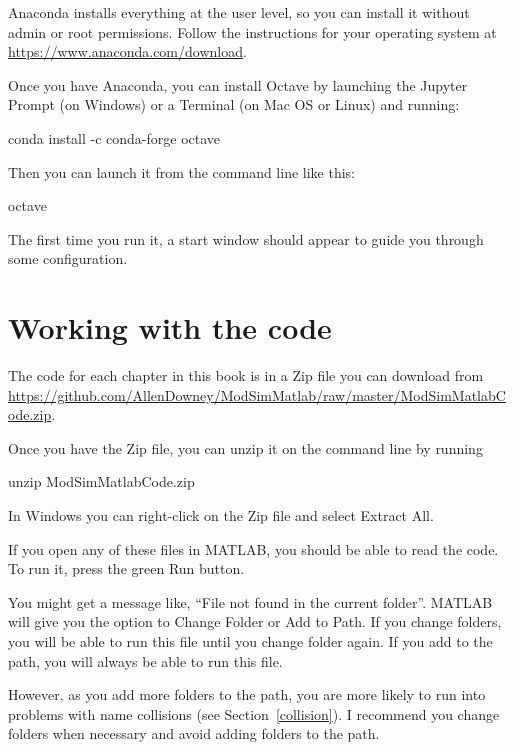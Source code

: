 Anaconda installs everything at the user level, so you can install it without admin or root permissions.  Follow the instructions for your operating system at \url{https://www.anaconda.com/download}.

Once you have Anaconda, you can install Octave by launching the Jupyter Prompt (on Windows) or a Terminal (on Mac OS or Linux) and running:

\begin{code}
conda install -c conda-forge octave
\end{code}

Then you can launch it from the command line like this:

\begin{code}
octave
\end{code}

The first time you run it, a start window should appear to guide you through some configuration.


\section{Working with the code}


The code for each chapter in this book is in a Zip file you can download from \url{https://github.com/AllenDowney/ModSimMatlab/raw/master/ModSimMatlabCode.zip}.

Once you have the Zip file, you can unzip it on the command line by running

\begin{code}
unzip ModSimMatlabCode.zip
\end{code}

In Windows you can right-click on the Zip file and select {\sf Extract All}.

If you open any of these files in MATLAB, you should be able to read the code.  To run it, press the green {\sf Run} button.

You might get a message like, ``File not found in the current folder''.
MATLAB will give you the option to {\sf Change Folder} or {\sf Add to Path}.  If you change folders, you will be able to run this file until you change folder again.  If you add to the path, you will always be able to run this file.

However, as you add more folders to the path, you are more likely to run into problems with name collisions (see Section~\ref{collision}).  I recommend you change folders when necessary and avoid adding folders to the path.


